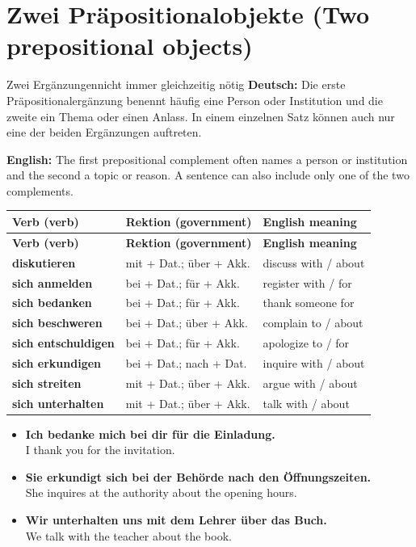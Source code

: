 \documentclass[a4paper,11pt]{article}
\newcommand{\GermanText}[1]{\textbf{Deutsch: }#1\par}
\newcommand{\EnglishText}[1]{{\small\color{SoftGray}\textbf{English: }#1\par}}
\newcommand{\ExampleItem}[2]{\item \textbf{#1}\\{\small\color{SoftGray}#2}}
\begin{document}
\section{Zwei Präpositionalobjekte (Two prepositional objects)}
\begin{grammarentry}{Zwei Ergänzungen}{nicht immer gleichzeitig nötig}
\GermanText{Die erste Präpositionalergänzung benennt häufig eine Person oder Institution und die zweite ein Thema oder einen Anlass. In einem einzelnen Satz können auch nur eine der beiden Ergänzungen auftreten.}
\EnglishText{The first prepositional complement often names a person or institution and the second a topic or reason. A sentence can also include only one of the two complements.}
\end{grammarentry}
\begin{longtable}{>{\raggedright\arraybackslash}p{} >{\raggedright\arraybackslash}p{} >{\raggedright\arraybackslash}p{}}
\rowcolor{HeaderBlueDark}
\color{white}\textbf{Verb (verb)} & \color{white}\textbf{Rektion (government)} & \color{white}\textbf{English meaning}\\
\endfirsthead
\rowcolor{HeaderBlueDark}
\color{white}\textbf{Verb (verb)} & \color{white}\textbf{Rektion (government)} & \color{white}\textbf{English meaning}\\
\endhead
\textbf{diskutieren} & mit + Dat.; über + Akk. & discuss with / about\\
\textbf{sich anmelden} & bei + Dat.; für + Akk. & register with / for\\
\textbf{sich bedanken} & bei + Dat.; für + Akk. & thank someone for\\
\textbf{sich beschweren} & bei + Dat.; über + Akk. & complain to / about\\
\textbf{sich entschuldigen} & bei + Dat.; für + Akk. & apologize to / for\\
\textbf{sich erkundigen} & bei + Dat.; nach + Dat. & inquire with / about\\
\textbf{sich streiten} & mit + Dat.; über + Akk. & argue with / about\\
\textbf{sich unterhalten} & mit + Dat.; über + Akk. & talk with / about\\
\end{longtable}
\begin{exbox}
\begin{itemize}
\ExampleItem{Ich bedanke mich bei dir für die Einladung.}{I thank you for the invitation.}
\ExampleItem{Sie erkundigt sich bei der Behörde nach den Öffnungszeiten.}{She inquires at the authority about the opening hours.}
\ExampleItem{Wir unterhalten uns mit dem Lehrer über das Buch.}{We talk with the teacher about the book.}
\end{itemize}
\end{exbox}
\end{document}
